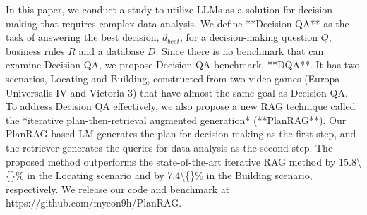 In this paper, we conduct a study to utilize LLMs as a solution for decision making that requires complex data analysis. We define **Decision QA** as the task of answering the best decision, $d_{best}$, for a decision-making question $Q$, business rules $R$ and a database $D$. Since there is no benchmark that can examine Decision QA, we propose Decision QA benchmark, **DQA**. It has two scenarios, Locating and Building, constructed from two video games (Europa Universalis IV and Victoria 3) that have almost the same goal as Decision QA. To address Decision QA effectively, we also propose a new RAG technique called the *iterative plan-then-retrieval augmented generation* (**PlanRAG**). Our PlanRAG-based LM generates the plan for decision making as the first step, and the retriever generates the queries for data analysis as the second step. The proposed method outperforms the state-of-the-art iterative RAG method by 15.8\textbackslash\{\}\% in the Locating scenario and by 7.4\textbackslash\{\}\% in the Building scenario, respectively. We release our code and benchmark at https://github.com/myeon9h/PlanRAG.